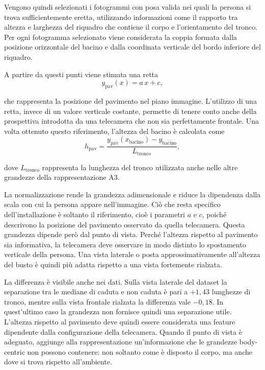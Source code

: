 Vengono quindi selezionati i fotogrammi con posa valida nei quali la persona si trova sufficientemente eretta, utilizzando informazioni come il rapporto tra altezza e larghezza del riquadro che contiene il corpo e l'orientamento del tronco. Per ogni fotogramma selezionato viene considerata la coppia formata dalla posizione orizzontale del bacino e dalla coordinata verticale del bordo inferiore del riquadro.

A partire da questi punti viene stimata una retta
\[
y_{\text{pav}}(x) = a\,x + c,
\]

che rappresenta la posizione del pavimento nel piano immagine. L'utilizzo di una retta, invece di un valore verticale costante, permette di tenere conto anche della prospettiva introdotta da una telecamera che non sia perfettamente frontale. Una volta ottenuto questo riferimento, l'altezza del bacino è calcolata come
\[
h_{\text{pav}} =
\frac{y_{\text{pav}}(x_{\text{bacino}}) - y_{\text{bacino}}}
                      {L_{\text{tronco}}},
\]

dove $L_{\text{tronco}}$ rappresenta la lunghezza del tronco utilizzata anche nelle altre grandezze della rappresentazione A3.

La normalizzazione rende la grandezza adimensionale e riduce la dipendenza dalla scala con cui la persona appare nell'immagine. Ciò che resta specifico dell'installazione è soltanto il riferimento, cioè i parametri $a$ e $c$, poiché descrivono la posizione del pavimento osservato da quella telecamera.
Questa grandezza dipende però dal punto di vista. Perché l'altezza rispetto al pavimento sia informativa, la telecamera deve osservare in modo distinto lo spostamento verticale della persona. Una vista laterale o posta approssimativamente all'altezza del busto è quindi più adatta rispetto a una vista fortemente rialzata.

La differenza è visibile anche nei dati. Sulla vista laterale del dataset la separazione tra le mediane di caduta e non caduta è pari a $+1{,}43$ lunghezze di tronco, mentre sulla vista frontale rialzata la differenza vale $-0{,}18$.
In quest'ultimo caso la grandezza non fornisce quindi una separazione utile.
L'altezza rispetto al pavimento deve quindi essere considerata una feature dipendente dalla configurazione della telecamera. Quando il punto di vista è adeguato, aggiunge alla rappresentazione un'informazione che le grandezze body-centric non possono contenere: non soltanto come è disposto il corpo, ma anche dove si trova rispetto all'ambiente.

